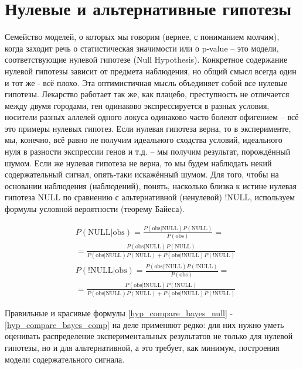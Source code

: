 \documentclass{book}
\begin{document}
\section*{Нулевые и альтернативные гипотезы}

Семейство моделей, о которых мы говорим (вернее, с пониманием молчим), когда заходит речь о статистическая значимости или о p-value -- это модели, соответствующие нулевой гипотезе (Null Hypothesis). Конкретное содержание нулевой гипотезы зависит от предмета наблюдения, но общий смысл всегда один и тот же - всё плохо. Эта оптимистичная мысль объединяет собой все нулевые гипотезы. Лекарство работает так же, как плацебо, преступность не отличается между двумя городами, ген одинаково экспрессируется в разных условия, носители разных аллелей одного локуса одинаково часто болеют офигением -- всё это примеры нулевых гипотез. Если нулевая гипотеза верна, то в эксперименте, мы, конечно, всё равно не получим идеального сходства условий, идеального нуля в разности экспрессии генов и т.д. -- мы получим результат, порождённый шумом. Если же нулевая гипотеза не верна, то мы будем наблюдать некий содержательный сигнал, опять-таки искажённый шумом. Для того, чтобы на основании наблюдения (наблюдений), понять, насколько близка к истине нулевая гипотеза $\text{NULL}$ по сравнению с альтернативной (ненулевой) $\text{!NULL}$, используем формулы условной вероятности (теорему Байеса). 

\begin{align}\label{hyp_compare_bayes_null}
   &P\left(\text{NULL|obs}\right)=
   \frac{P\left(\text{obs|NULL}\right) P\left(\text{NULL}\right)}{P\left(\text{obs}\right)} = \nonumber \\
   &=\frac{P\left(\text{obs|NULL}\right) P\left(\text{NULL}\right)}{P\left(\text{obs|NULL}\right) P\left(\text{NULL}\right)+P\left(\text{obs|!NULL}\right) P\left(\text{!NULL}\right)} 
\end{align}
\begin{align}\label{hyp_compare_bayes_not_null}
   &P\left(\text{!NULL|obs}\right)=
   \frac{P\left(\text{obs|!NULL}\right) P\left(\text{!NULL}\right)}{P\left(\text{obs}\right)} = \nonumber \\
   &=\frac{P\left(\text{obs|!NULL}\right) P\left(\text{!NULL}\right)}{P\left(\text{obs|NULL}\right) P\left(\text{NULL}\right)+P\left(\text{obs|!NULL}\right) P\left(\text{!NULL}\right)}
\end{align}




Правильные и красивые формулы \eqref{hyp_compare_bayes_null} - \eqref{hyp_compare_bayes_comp} на деле применяют редко: для них нужно уметь оценивать распределение экспериментальных результатов не только для нулевой гипотезы, но и для альтернативной, а это требует, как минимум, построения модели содержательного сигнала. 
\end{document}
